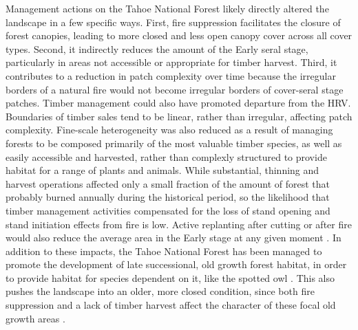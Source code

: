 Management actions on the Tahoe National Forest likely directly altered the landscape in a few specific ways. First, fire suppression facilitates the closure of forest canopies, leading to more closed and less open canopy cover across all cover types. Second, it indirectly reduces the amount of the Early seral stage, particularly in areas not accessible or appropriate for timber harvest. Third, it contributes to a reduction in patch complexity over time because the irregular borders of a natural fire would not become irregular borders of cover-seral stage patches. Timber management could also have promoted departure from the HRV. Boundaries of timber sales tend to be linear, rather than irregular, affecting patch complexity. Fine-scale heterogeneity was also reduced as a result of managing forests to be composed primarily of the most valuable timber species, as well as easily accessible and harvested, rather than complexly structured to provide habitat for a range of plants and animals. While substantial, thinning and harvest operations affected only a small fraction of the amount of forest that probably burned annually during the historical period, so the likelihood that timber management activities compensated for the loss of stand opening and stand initiation effects from fire is low. Active replanting after cutting or after fire would also reduce the average area in the Early stage at any given moment %
. In addition to these impacts, the Tahoe National Forest has been managed to promote the development of late successional, old growth forest habitat, in order to provide habitat for species dependent on it, like the spotted owl \citep{USDAForestService2004a}. This also pushes the landscape into an older, more closed condition, since both fire suppression and a lack of timber harvest affect the character of these focal old growth areas \citep{Franklin1996}.


